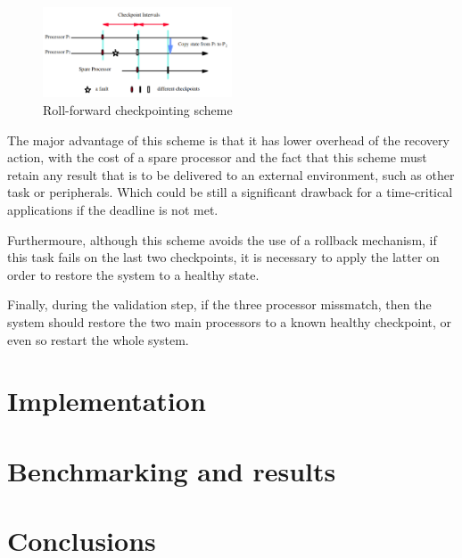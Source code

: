 \documentclass[10pt, a4paper]{report}
\begin{document}
\begin{figure}[h!]
    \begin{center}
        \includegraphics[width=0.5\textwidth]{rollforward_scheme.png}
        \caption{Roll-forward checkpointing scheme}
        \label{rollforward_scheme}
    \end{center}
\end{figure}

The major advantage of this scheme is that it has lower overhead of the recovery
action, with the cost of a spare processor and the fact that this scheme must
retain any result that is to be delivered to an external environment, such as
other task or peripherals. Which could be still a significant drawback for a
time-critical applications if the deadline is not met.

Furthermoure, although this scheme avoids the use of a rollback mechanism, if
this task fails on the last two checkpoints, it is necessary to apply the latter
on order to restore the system to a healthy state.

Finally, during the validation step, if the three processor missmatch, then the
system should restore the two main processors to a known healthy checkpoint, or
even so restart the whole system.

\chapter{Implementation}
\thispagestyle{fancy}

\chapter{Benchmarking and results}
\thispagestyle{fancy}

\chapter{Conclusions}
\thispagestyle{fancy}

\begin{printbibliography}
    \thispagestyle{fancy}
\end{printbibliography}

\begin{printnoidxglossaries}
    \thispagestyle{fancy}
\end{printnoidxglossaries}
\end{document}
